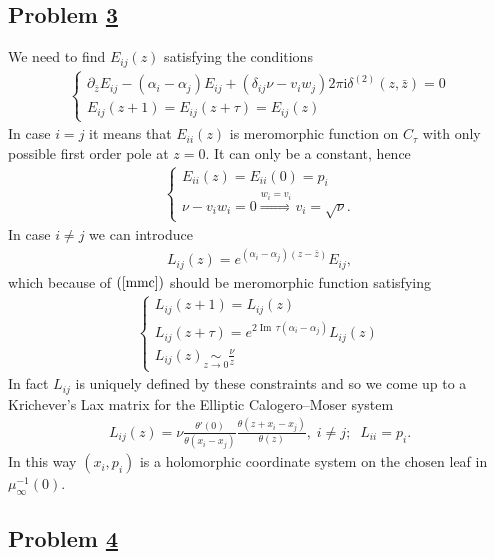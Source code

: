 \documentclass[12pt]{article}
\numberwithin{equation}{section}
\renewcommand{\Im}{{\operatorname{Im}\,}}
\theoremstyle{definition}
\newcommand {\ii} {\mathrm{i}}
\newcommand{\myhref}[2]{\hyperref[#1]{#2}}%
\begin{document}
\subsection{Problem \myhref{prob3}{3}}
We need to find $E_{ij}(z)$ satisfying the conditions
\begin{align}
\begin{cases}\label{mmc}
    \partial_{\bar{z}} E_{ij} - (\alpha_i - \alpha_j ) E_{ij} + (\delta_{ij} \nu - v_i w_j ) 2 \pi {\ii} \delta^{(2)} (z, \bar{z}) = 0 \\
    E_{ij}(z+1) = E_{ij} (z + \tau) = E_{ij} (z)
    \end{cases}
\end{align}
In case $i = j$ it means that $E_{ii}(z)$ is meromorphic function on $C_{\tau}$ with only possible first order pole at $z = 0$. It can only be a constant, hence
\begin{align*}
\begin{cases}
    E_{ii}(z) = E_{ii}(0) = p_i\\
    \nu - v_i w_i = 0 \stackrel{w_i = v_i}{\Rightarrow} v_i = \sqrt{\nu}.
\end{cases}
\end{align*}
In case $i \neq j$ we can introduce
\begin{align}\label{elax}
    L_{ij}(z) = e^{(\alpha_i - \alpha_j)(z - \bar{z})} E_{ij},
\end{align}
which because of $(\ref{mmc})$ should be meromorphic function satisfying
\begin{align*}
    \begin{cases}
        L_{ij} (z+1) = L_{ij}(z)\\
        L_{ij}(z + \tau) = e^{2 \Im \tau (\alpha_i - \alpha_j) } L_{ij} (z)\\
        L_{ij}(z) \underset{z \rightarrow 0}{\sim} \frac{\nu}{z} 
    \end{cases}
\end{align*}
In fact $L_{ij}$ is uniquely defined by these constraints and so we come up to a Krichever's Lax matrix for the Elliptic Calogero--Moser system \cite{Kr}
\begin{align*}
    L_{ij}(z) = \nu \frac{\theta' (0)}{\theta (x_i - x_j )}\frac{\theta(z + x_i - x_j)}{\theta(z)}, \; i \neq j ; \;\;L_{ii} = p_i . 
\end{align*}
In this way $(x_i , p_i)$ is a holomorphic coordinate system on the chosen leaf in $\mu^{-1}_{\infty}(0)$.

\subsection{Problem \myhref{prob4}{4}}
\end{document}
